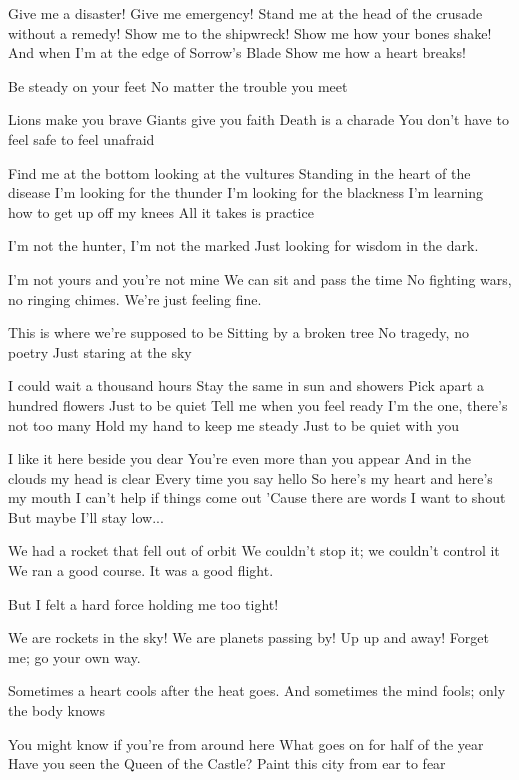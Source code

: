 Give me a disaster!
Give me emergency!
Stand me at the head of the crusade without a remedy!
Show me to the shipwreck!
Show me how your bones shake!
And when I'm at the edge of Sorrow's Blade
Show me how a heart breaks!

Be steady on your feet
No matter the trouble you meet

Lions make you brave
Giants give you faith
Death is a charade
You don't have to feel safe to feel unafraid

Find me at the bottom looking at the vultures
Standing in the heart of the disease
I'm looking for the thunder
I'm looking for the blackness
I'm learning how to get up off my knees
All it takes is practice

I'm not the hunter, I'm not the marked
Just looking for wisdom in the dark.


I'm not yours and you're not mine
We can sit and pass the time
No fighting wars, no ringing chimes.
We're just feeling fine.

This is where we're supposed to be
Sitting by a broken tree
No tragedy, no poetry
Just staring at the sky

I could wait a thousand hours
Stay the same in sun and showers
Pick apart a hundred flowers
Just to be quiet
Tell me when you feel ready
I'm the one, there's not too many
Hold my hand to keep me steady
Just to be quiet with you

I like it here beside you dear
You're even more than you appear
And in the clouds my head is clear
Every time you say hello
So here's my heart and here's my mouth
I can't help if things come out
'Cause there are words I want to shout
But maybe I'll stay low...


We had a rocket that fell out of orbit
We couldn't stop it; we couldn't control it
We ran a good course. It was a good flight.

But I felt a hard force holding me too tight!

We are rockets in the sky!
We are planets passing by!
Up up and away!
Forget me; go your own way.

Sometimes a heart cools after the heat goes.
And sometimes the mind fools; only the body knows


You might know if you're from around here
What goes on for half of the year
Have you seen the Queen of the Castle?
Paint this city from ear to fear

